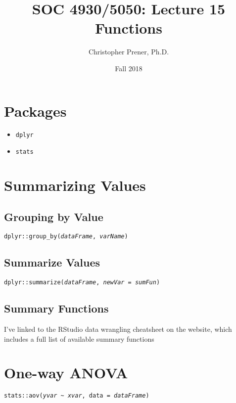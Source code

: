 \documentclass{tufte-handout}
\title{SOC 4930/5050: Lecture 15 Functions}
\author{Christopher Prener, Ph.D.}
\date{Fall 2018}
\newenvironment{subs}
  {\adjustwidth{3em}{0pt}}
  {\endadjustwidth}
\begin{document}
\maketitle %

\vspace{5mm}
\section{Packages}
\begin{itemize}
\item \texttt{dplyr}
\item \texttt{stats}
\end{itemize}

\vspace{5mm}
\section{Summarizing Values}
\begin{subs}
\subsection{Grouping by Value}
\noindent \texttt{dplyr::}{\color{red}\texttt{group\_by}}\texttt{(\textit{dataFrame}, \textit{varName})}

\vspace{3mm}
\subsection{Summarize Values}
\noindent \texttt{dplyr::}{\color{red}\texttt{summarize}}\texttt{(\textit{dataFrame}, \textit{newVar} = \textit{sumFun})}

\vspace{3mm}
\subsection{Summary Functions}
\noindent I've linked to the RStudio data wrangling cheatsheet on the website, which includes a full list of available summary functions
\end{subs}

\vspace{5mm}
\section{One-way ANOVA}
\noindent \texttt{stats::}{\color{red}\texttt{aov}}\texttt{(\textit{yvar} \textasciitilde\ \textit{xvar}, data = \textit{dataFrame})}
\end{document}
